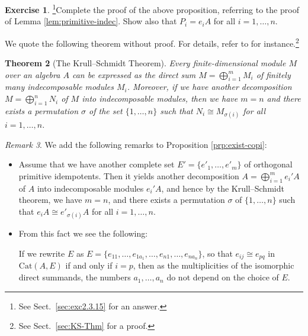 \documentclass{surv-l}
\makeatletter
\DeclareRobustCommand{\forcelinebreak}{%
    \@ifstar{\unskip\\\ignorespaces}{\unskip\linebreak}%
}
\numberwithin{equation}{chapter}
\numberwithin{figure}{chapter}
\theoremstyle{plain}
\newtheorem{thm}{Theorem}[section]
\theoremstyle{definition}
\newtheorem{exc}[thm]{Exercise}
\theoremstyle{remark}
\newtheorem{rmk}[thm]{Remark}
\makeatother
\begin{document}
\begin{exc}\hspace{-1.2ex}\footnote{See Sect.\ \ref{sec:exc2.3.15} for an answer.}\label{ex:2.3.15}
Complete the proof of the above proposition, referring to the proof of
Lemma \ref{lem:primitive-indec}.
Show also that $P_i = e_iA$ for all $i = 1,\dots, n$.
\end{exc}

We quote the following theorem without proof.
For details, refer to \cite[12.9 The Krull--Schmidt Theorem]{GTM13}
for instance.\footnote{See Sect.\ \ref{sec:KS-Thm} for a proof.}

\begin{thm}[The Krull--Schmidt Theorem]\label{thm:KS}\label{thm:2.3.16}
Every finite-dimensional\forcelinebreak{} module $M$ over an algebra $A$
can be expressed as the direct sum
$M = \bigoplus_{i=1}^m M_i$
of finitely many indecomposable modules $M_i$.
Moreover, if we have another decomposition
$M = \bigoplus_{i=1}^n N_i$
of $M$ into indecomposable modules, then
we have $m = n$ and there exists a permutation $\sigma$ of the set $\{1,\dots, n\}$
such that
$N_i \cong M_{\sigma(i)}$ for all $i=1, \dots, n$.
\end{thm}

\begin{rmk}
We add the following remarks to Proposition \ref{prp:exist-copi}:
\begin{itemize}
\item
Assume that we have another complete set $E'=\{e'_1,\dots, e'_m\}$
of orthogonal primitive idempotents.
Then it yields another decomposition $A = \bigoplus_{i=1}^m e_i'A$ of $A$ into indecomposable modules
$e_i'A$, and hence by the Krull--Schmidt theorem,
we have $m=n$, and there exists a permutation $\sigma$ of $\{1, \dots ,n\}$
such that $e_iA \cong e'_{\sigma(i)}A$ for all $i=1,\dots,n$.
\item
From this fact we see the following:

If we rewrite $E$ as
$E = \{e_{11},\dots, e_{1a_1}, \dots, e_{n1},\dots, e_{na_n}\}$,
so that $e_{ij} \cong e_{pq}$ in $\mathrm{Cat}(A, E)$ if and only if $i=p$,
then as the multiplicities of the isomorphic direct summands,
the numbers $a_1,\dots, a_n$
do not depend on the choice of $E$.
\end{itemize}
\end{rmk}
\end{document}
